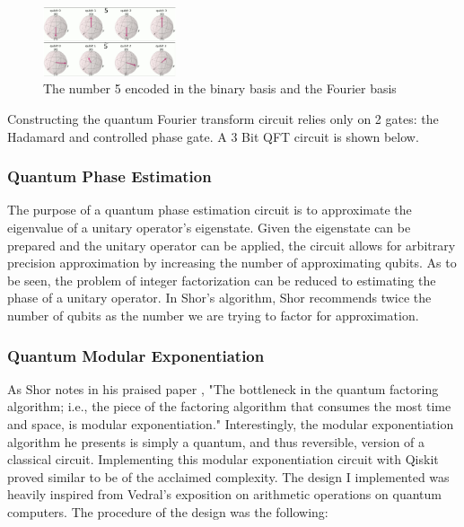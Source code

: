 \documentclass[journal]{IEEEtran}
\begin{document}
\begin{figure}[H]
    \begin{center}
        \includegraphics[width=0.35\textwidth]{FourierBasis.png}
        \caption{\label{fig:FourierBasis} The number 5 encoded in the binary basis and the Fourier basis }
    \end{center}
\end{figure}


Constructing the quantum Fourier transform circuit relies only on 2 gates: the Hadamard and
controlled phase gate. A 3 Bit QFT circuit is shown below.

\subsubsection{Quantum Phase Estimation}

The purpose of a quantum phase estimation circuit is to approximate the
eigenvalue of a unitary operator's eigenstate. Given the eigenstate can be
prepared and the unitary operator can be applied, the circuit allows for
arbitrary precision approximation by increasing the number of approximating
qubits. As to be seen, the problem of integer factorization can be reduced to
estimating the phase of a unitary operator. In Shor's algorithm, Shor recommends
twice the number of qubits as the number we are trying to factor for
approximation.

\subsubsection{Quantum Modular Exponentiation}

As Shor notes in his praised paper \cite{Shor1997}, "The bottleneck in the
quantum factoring algorithm; i.e., the piece of the factoring algorithm that
consumes the most time and space, is modular exponentiation." Interestingly, the
modular exponentiation algorithm he presents is simply a quantum, and thus
reversible, version of a classical circuit. Implementing this modular
exponentiation circuit with Qiskit proved similar to be of the acclaimed
complexity. The design I implemented was heavily inspired from Vedral's
exposition \cite{Vedral1996} on arithmetic operations on quantum computers. The
procedure of the design was the following:
\end{document}

